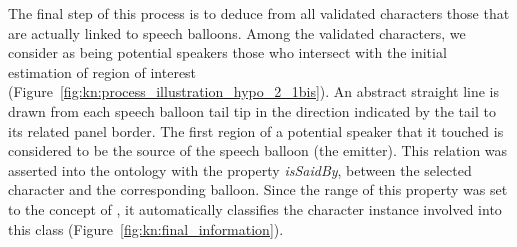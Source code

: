 The final step of this process is to deduce from all validated characters those that are actually linked to speech balloons.
Among the validated characters, we consider as being potential speakers those who intersect with the initial estimation of region of interest (Figure~\ref{fig:kn:process_illustration_hypo_2_1bis}).
An abstract straight line is drawn from each speech balloon tail tip in the direction indicated by the tail to its related panel border.
The first region of a potential speaker that it touched is considered to be the source of the speech balloon (the emitter).
This relation was asserted into the ontology with the property \textit{isSaidBy}, between the selected character and the corresponding balloon.
Since the range of this property was set to the concept of , it automatically classifies the character instance involved into this class (Figure~\ref{fig:kn:final_information}).



